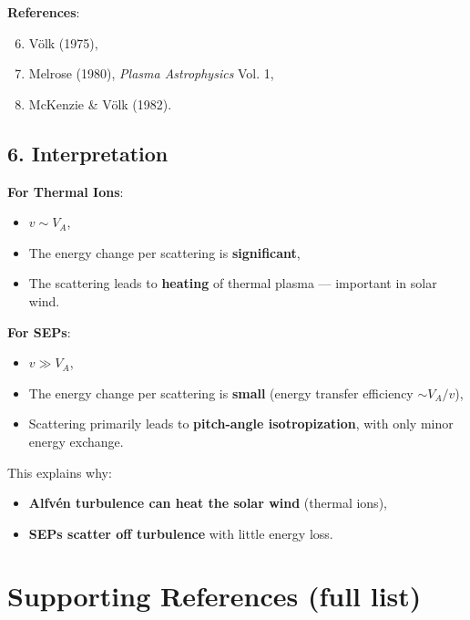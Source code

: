 \noindent
\textbf{References}:
\begin{enumerate}
    \setcounter{enumi}{5}
    \item Völk (1975),
    \item Melrose (1980), \textit{Plasma Astrophysics} Vol. 1,
    \item McKenzie \& Völk (1982).
\end{enumerate}

\hrulefill

\subsection*{6. \textbf{Interpretation}}

\textbf{For Thermal Ions}:
\begin{itemize}
    \item $v \sim V_A$,
    \item The energy change per scattering is \textbf{significant},
    \item The scattering leads to \textbf{heating} of thermal plasma --- important in solar wind.
\end{itemize}

\textbf{For SEPs}:
\begin{itemize}
    \item $v \gg V_A$,
    \item The energy change per scattering is \textbf{small} (energy transfer efficiency $\sim V_A/v$),
    \item Scattering primarily leads to \textbf{pitch-angle isotropization}, with only minor energy exchange.
\end{itemize}

This explains why:
\begin{itemize}
    \item \textbf{Alfvén turbulence can heat the solar wind} (thermal ions),
    \item \textbf{SEPs scatter off turbulence} with little energy loss.
\end{itemize}

\hrulefill

\section*{\texorpdfstring{ \textbf{Supporting References (full list)}}{}}

